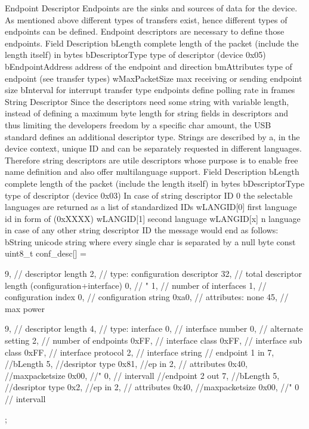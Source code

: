 Endpoint  Descriptor
Endpoints are the sinks and sources of data for the device. As mentioned above different types of transfers exist, hence different types of endpoints can be defined. Endpoint descriptors are necessary to define those endpoints.
Field
Description
bLength
complete length of the packet (include the length itself) in bytes
bDescriptorType
type of descriptor (device 0x05)
bEndpointAddress
address of the endpoint and direction
bmAttributes
type of endpoint (see transfer types)
wMaxPacketSize
max receiving or sending endpoint size
bInterval
for interrupt transfer type endpoints define polling rate in frames
String  Descriptor
Since the descriptors need some string with variable length, instead of defining a maximum byte length for string fields in descriptors and thus limiting the developers freedom by a specific char amount, the USB standard defines an additional descriptor type. Strings are described by a, in the device context, unique ID and can be separately requested in  different languages. Therefore string descriptors are utile descriptors whose purpose is to enable free name definition and also offer multilanguage support.
Field
Description
bLength
complete length of the packet (include the length itself) in bytes
bDescriptorType
type of descriptor (device 0x03)
In case of string descriptor ID 0 the selectable languages are returned as a list of standardized IDs
wLANGID[0]
first language id in form of (0xXXXX)
wLANGID[1]
second language
wLANGID[x]
n language 
in case of any other string descriptor ID the  message would end as follows:
bString
unicode string where every single char is separated by a null byte
const uint8_t conf_desc[] = {
	9,      // descriptor length
	2,      // type: configuration descriptor
	32,     // total descriptor length (configuration+interface)
	0,      //  "
	1,      // number of interfaces
	1,      // configuration index
	0,      // configuration string
	0xa0,   // attributes: none
	45,      // max power

	9,      // descriptor length
	4,      // type: interface
	0,      // interface number
	0,      // alternate setting
	2,      // number of endpoints
	0xFF,      // interface class
	0xFF,      // interface sub class
	0xFF,      // interface protocol
	2,       // interface string
	// endpoint 1 in
	7,      //bLength
	5,      //desriptor type
	0x81,    //ep in
	2,         // attributes
	0x40,    //maxpacketsize
	0x00,    //"
	0,      // intervall
	//endpoint 2 out
	7,      //bLength
	5,      //desriptor type
	0x2,    //ep in
	2,         // attributes
	0x40,    //maxpacketsize
	0x00,    //"
	0      // intervall
};

